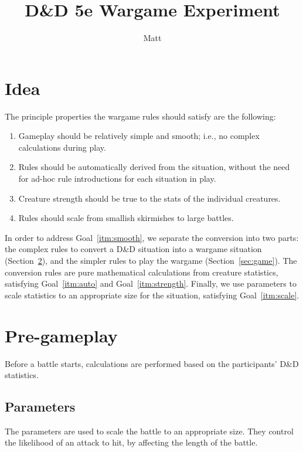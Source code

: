 \documentclass{article}
\begin{document}
\title{D\&D 5e Wargame Experiment}
\author{Matt}
\maketitle

\section{Idea}

The principle properties the wargame rules should satisfy are the following:
\begin{enumerate}
    \item \label{itm:smooth} Gameplay should be relatively simple and smooth;
        i.e., no complex calculations during play.
    \item \label{itm:auto} Rules should be automatically derived from the situation,
        without the need for ad-hoc rule introductions for each situation in play.
    \item \label{itm:strength} Creature strength should be true to the stats of the individual creatures.
    \item \label{itm:scale} Rules should scale from smallish skirmishes to large battles.
\end{enumerate}

In order to address Goal~\ref{itm:smooth}, we separate the conversion into two parts:
the complex rules to convert a D\&D situation into a wargame situation (Section~\ref{sec:pregame}),
and the simpler rules to play the wargame (Section~\ref{sec:game}).
The conversion rules are pure mathematical calculations from creature statistics,
satisfying Goal~\ref{itm:auto} and Goal~\ref{itm:strength}.
Finally, we use parameters to scale statistics to an appropriate size for the situation,
satisfying Goal~\ref{itm:scale}.

\section{Pre-gameplay}\label{sec:pregame}

Before a battle starts,
calculations are performed based on the participants' D\&D statistics.

\subsection{Parameters}

The parameters are used to scale the battle to an appropriate size.
They control the likelihood of an attack to hit,
by affecting the length of the battle.
\end{document}
